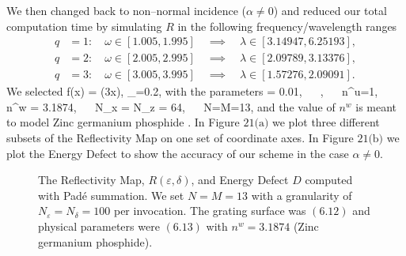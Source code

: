 \vspace{-18mm}
We then changed back to  non--normal incidence ($\alpha \neq 0$) and reduced our total computation time by simulating $R$ in the following frequency/wavelength ranges
\begin{align*}
q&=1:\quad \omega\in[1.005,1.995] \quad\implies\quad \lambda\in[3.14947,6.25193],\\
q&=2:\quad \omega\in[2.005,2.995] \quad\implies\quad\lambda\in[2.09789,3.13376],\\
q&=3:\quad \omega\in[3.005,3.995] \quad\implies\quad \lambda\in[1.57276,2.09091].
\end{align*}
We selected
\be
f(x) = \cos(3x),
\quad
\varepsilon_{}=0.2,
\ee
with the parameters
\be
\alpha = 0.01,
~~
,
~~
n^u=1,
~~ 
n^w = 3.1874,
~~
N_x = N_z = 64,
~~
N=M=13,
\ee
and the value of $n^w$ is meant to model Zinc germanium phosphide \cite{das2003linear}.
In Figure $21\text{(a)}$ we plot three different subsets of the Reflectivity
Map on one set of coordinate axes. In Figure $21\text{(b)}$ we plot the
Energy Defect to show the accuracy of our scheme in the case $\alpha \neq 0$.
\vspace{-18mm}
%
%
\begin{figure}[H]
    \centering
    \caption{The Reflectivity Map, $R(\varepsilon,\delta)$, and Energy Defect
    $D$ computed with Pad\'e summation. We set 
    $N=M=13$ with a granularity of $N_{\varepsilon}=N_{\delta}=100$ per 
    invocation. The grating surface was $(6.12)$ and physical parameters were $(6.13)$ with $n^w=3.1874$ (Zinc germanium phosphide).}
    \label{Fig:RM:Flint}
\end{figure}


